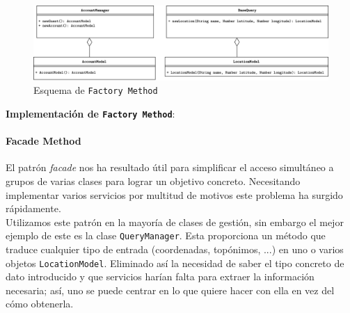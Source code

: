 \documentclass[../ei103948-project-documentation.tex]{subfiles}
\begin{document}
                        \begin{figure}[H]
                            \begin{center}
                                \hspace*{-4mm}
                            \includegraphics[scale=0.125]{images/FactoryMethod.png}
                            \end{center}
                            \caption{Esquema de \texttt{Factory Method}}
                        \end{figure}
            
                        \textbf{Implementación de \texttt{Factory Method}}:
                        
            
                        
            
            
            
                        \paragraph{Facade Method}
                        El patrón \textit{facade} nos ha resultado útil para simplificar el acceso simultáneo a grupos de varias clases para lograr un objetivo concreto. Necesitando implementar varios servicios por multitud de motivos este problema ha surgido rápidamente.\\
            
                        Utilizamos este patrón en la mayoría de clases de gestión, sin embargo el mejor ejemplo de este es la clase \texttt{QueryManager}. Esta proporciona un método que traduce cualquier tipo de entrada (coordenadas, topónimos, ...) en uno o varios objetos \texttt{LocationModel}. Eliminado así la necesidad de saber el tipo concreto de dato introducido y que servicios harían falta para extraer la información necesaria; así, uno se puede centrar en lo que quiere hacer con ella en vez del cómo obtenerla.
            
\end{document}
